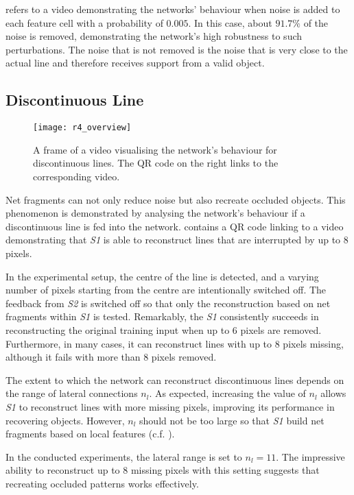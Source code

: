 refers to a video demonstrating the networks' behaviour when noise is added to each feature cell with a probability of $0.005$.
In this case, about $91.7\%$ of the noise is removed, demonstrating the network's high robustness to such perturbations.
The noise that is not removed is the noise that is very close to the actual line and therefore receives support from a valid object.

\subsection{Discontinuous Line}
%
\begin{figure}[h]
    \centering
    \texttt{[image: r4\_overview]}
    \caption[Video visualising the network's behaviour for discontinuous lines]{A frame of a video visualising the network's behaviour for discontinuous lines. The QR code on the right links to the corresponding video.}
\end{figure}
%
Net fragments  can not only reduce noise but also recreate occluded objects.
This phenomenon is demonstrated by analysing the network's behaviour if a discontinuous line is fed into the network.
 contains a QR code linking to a video demonstrating that \emph{S1} is able to reconstruct lines that are interrupted by up to $8$ pixels.

In the experimental setup, the centre of the line is detected, and a varying number of pixels starting from the centre are intentionally switched off.
The feedback from \emph{S2} is switched off so that only the reconstruction based on net fragments within \emph{S1} is tested.
Remarkably, the \emph{S1} consistently succeeds in reconstructing the original training input when up to $6$ pixels are removed. Furthermore, in many cases, it can reconstruct lines with up to $8$ pixels missing, although it fails with more than $8$ pixels removed.

The extent to which the network can reconstruct discontinuous lines depends on the range of lateral connections $n_l$. As expected, increasing the value of $n_l$ allows \emph{S1} to reconstruct lines with more missing pixels, improving its performance in recovering objects.
However, $n_l$ should not be too large so that \emph{S1} build net fragments based on local features (c.f. ).

In the conducted experiments, the lateral range is set to $n_l=11$.
The impressive ability to reconstruct up to $8$ missing pixels with this setting suggests that recreating occluded patterns works effectively.


